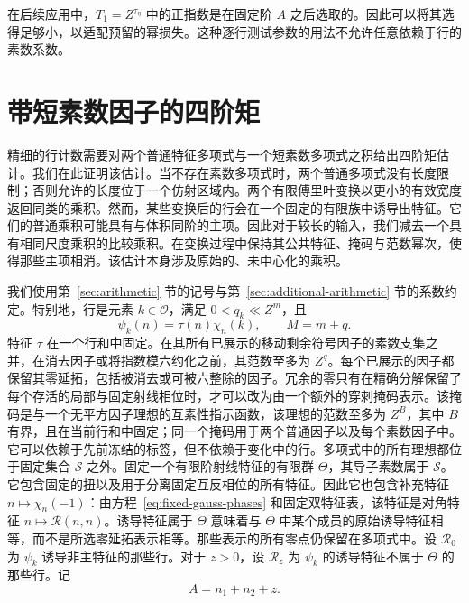 \documentclass[11pt,a4paper]{article}
\numberwithin{equation}{section}
\numberwithin{figure}{section}
\theoremstyle{definition}
\theoremstyle{remark}
\begin{document}
在后续应用中，\(T_1=Z^{\tau_\eta}\) 中的正指数是在固定阶 \(A\) 之后选取的。因此可以将其选得足够小，以适配预留的幂损失。这种逐行测试参数的用法不允许任意依赖于行的素数系数。

\section{带短素数因子的四阶矩}\label{sec:plain}

精细的行计数需要对两个普通特征多项式与一个短素数多项式之积给出四阶矩估计。我们在此证明该估计。当不存在素数多项式时，两个普通多项式没有长度限制；否则允许的长度位于一个仿射区域内。两个有限傅里叶变换以更小的有效宽度返回同类的乘积。然而，某些变换后的行会在一个固定的有限族中诱导出特征。它们的普通乘积可能具有与体积同阶的主项。因此对于较长的输入，我们减去一个具有相同尺度乘积的比较乘积。在变换过程中保持其公共特征、掩码与范数幂次，使得那些主项相消。该估计本身涉及原始的、未中心化的乘积。

我们使用第~\ref{sec:arithmetic} 节的记号与第~\ref{sec:additional-arithmetic} 节的系数约定。特别地，行是元素 \(k\in\mathcal O\)，满足 \(0<q_k\ll Z^m\)，且
\[
 \psi_k(n)=\tau(n)\chi_n(k),\qquad M=m+q.
\]
特征 \(\tau\) 在一个行和中固定。在其所有已展示的移动剩余符号因子的素数支集之并，在消去因子或将指数模六约化之前，其范数至多为 \(Z^q\)。每个已展示的因子都保留其零延拓，包括被消去或可被六整除的因子。冗余的零只有在精确分解保留了每个存活的局部与固定射线相位时，才可以改为由一个额外的穿刺掩码表示。该掩码是与一个无平方因子理想的互素性指示函数，该理想的范数至多为 \(Z^B\)，其中 \(B\) 有界，且在当前行和中固定；同一个掩码用于两个普通因子以及每个素数因子中。它可以依赖于先前冻结的标签，但不依赖于变化中的行。多项式中的所有理想都位于固定集合 \(\mathcal S\) 之外。固定一个有限阶射线特征的有限群 \(\Theta\)，其导子素数属于 \(\mathcal S\)。它包含固定的扭以及用于分离固定互反相位的所有特征。因此它也包含补充特征 \(n\mapsto\chi_n(-1)\)：由方程~\eqref{eq:fixed-gauss-phases} 和固定双特征表，该特征是对角特征 \(n\mapsto\mathcal R(n,n)\)。诱导特征属于 \(\Theta\) 意味着与 \(\Theta\) 中某个成员的原始诱导特征相等，而不是所选零延拓表示相等。那些表示的所有零点仍保留在多项式中。设 \(\mathcal R_0\) 为 \(\psi_k\) 诱导非主特征的那些行。对于 \(z>0\)，设 \(\mathcal R_z\) 为 \(\psi_k\) 的诱导特征不属于 \(\Theta\) 的那些行。记
\begin{equation}
 A=n_1+n_2+z.
 \label{old-eq:3.1}
\end{equation}
\end{document}
